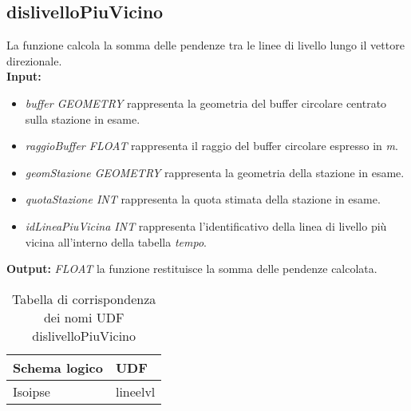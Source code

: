 \subsection{dislivelloPiuVicino}
La funzione calcola la somma delle pendenze tra le linee di livello lungo il vettore direzionale.\\
\textbf{Input:} 
\begin{itemize}
\item \textit{buffer GEOMETRY} rappresenta la geometria del buffer circolare centrato sulla stazione in esame.
\item \textit{raggioBuffer FLOAT} rappresenta il raggio del buffer circolare espresso in \textit{m}.
\item \textit{geomStazione GEOMETRY} rappresenta la geometria della stazione in esame.
\item \textit{quotaStazione INT} rappresenta la quota stimata della stazione in esame.
\item \textit{idLineaPiuVicina INT} rappresenta l'identificativo della linea di livello più vicina all'interno della tabella \textit{tempo}.
\end{itemize}
\textbf{Output:} \textit{FLOAT} la funzione restituisce la somma delle pendenze calcolata. 

\begin{table}[h]
\centering
\caption{Tabella di corrispondenza dei nomi UDF dislivelloPiuVicino}
\label{mapTb3}
\begin{tabular}{|l|l|}
\hline
Schema logico & UDF      \\ \hline
Isoipse       & lineelvl \\ \hline
\end{tabular}
\end{table} 

